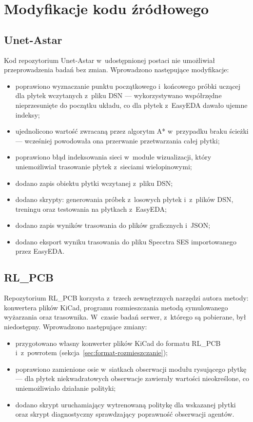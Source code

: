 \section{Modyfikacje kodu źródłowego}
\label{sec:modyfikacje}

\subsection{Unet-Astar}
\label{sec:modyfikacje-unet}

Kod repozytorium Unet-Astar w~udostępnionej postaci nie umożliwiał
przeprowadzenia badań bez zmian. Wprowadzono następujące modyfikacje:
\begin{itemize}
  \item poprawiono wyznaczanie punktu początkowego i~końcowego próbki uczącej
    dla płytek wczytanych z~pliku DSN --- wykorzystywano współrzędne
    nieprzesunięte do początku układu, co dla płytek z~EasyEDA dawało
    ujemne indeksy;
  \item ujednolicono wartość zwracaną przez algorytm A* w~przypadku
    braku ścieżki --- wcześniej powodowała ona przerwanie przetwarzania
    całej płytki;
  \item poprawiono błąd indeksowania sieci w~module wizualizacji, który
    uniemożliwiał trasowanie płytek z~sieciami wielopinowymi;
  \item dodano zapis obiektu płytki wczytanej z~pliku DSN;
  \item dodano skrypty: generowania próbek z~losowych płytek i~z~plików DSN,
    treningu oraz testowania na płytkach z~EasyEDA;
  \item dodano zapis wyników trasowania do plików graficznych i~JSON;
  \item dodano eksport wyniku trasowania do pliku Specctra SES
    importowanego przez EasyEDA.
\end{itemize}

\subsection{RL\_PCB}
\label{sec:modyfikacje-rlpcb}

Repozytorium RL\_PCB korzysta z~trzech zewnętrznych narzędzi autora
metody: konwertera plików KiCad, programu rozmieszczania metodą
symulowanego wyżarzania oraz trasownika. W~czasie badań serwer, z~którego
są pobierane, był niedostępny. Wprowadzono następujące zmiany:
\begin{itemize}
  \item przygotowano własny konwerter plików KiCad do formatu RL\_PCB
    i~z~powrotem (sekcja~\ref{sec:format-rozmieszczanie});
  \item poprawiono zamienione osie w~siatkach obserwacji modułu
    rysującego płytkę --- dla płytek niekwadratowych obserwacje zawierały
    wartości nieokreślone, co uniemożliwiało działanie polityki;
  \item dodano skrypt uruchamiający wytrenowaną politykę dla wskazanej
    płytki oraz skrypt diagnostyczny sprawdzający poprawność obserwacji
    agentów.
\end{itemize}

